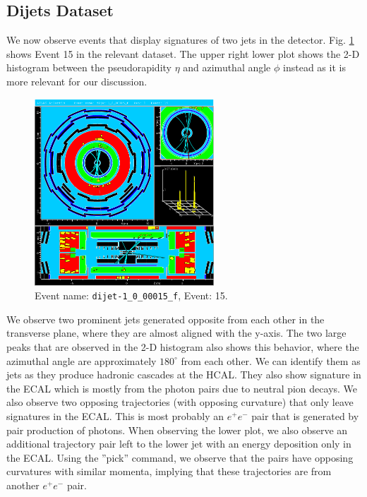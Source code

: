 \documentclass[a4paper]{report}
\numberwithin{equation}{section}
\begin{document}
\subsection{Dijets Dataset}

We now observe events that display signatures of two jets in the detector. Fig. \ref{fig:dijets} shows Event 15 in the relevant dataset. 
The upper right lower plot shows the 2-D histogram between the pseudorapidity $\eta$ and azimuthal angle $\phi$ instead as it is more 
relevant for our discussion.

\begin{figure}[htpb]
    \centering
    \includegraphics[width=0.6\textwidth]{dijet_event15.eps}
    \caption{Event name: \texttt{dijet-1\_0\_00015\_f}, Event: 15. }
    \label{fig:dijets}
\end{figure}

We observe two prominent jets generated opposite from each other in the transverse plane, where they are almost aligned with the y-axis.
 The two large peaks that are observed in the 2-D histogram also shows this behavior, where the azimuthal angle are approximately $180^\circ$ from each other. We can 
identify them as jets as they produce hadronic cascades at the HCAL. They also show signature in the ECAL which is mostly from the photon
pairs due to neutral pion decays. We also observe two opposing trajectories (with opposing curvature) that only leave signatures
 in the ECAL. This is most probably an $e^+e^-$ pair that is generated by pair production of photons. When observing the lower plot, 
 we also observe an additional trajectory pair left to the lower jet with an energy deposition only in the ECAL.
  Using the ''pick'' command, we observe that the pairs have opposing curvatures with similar momenta, implying that these trajectories
  are from another $e^+e^-$ pair. 
\end{document}
